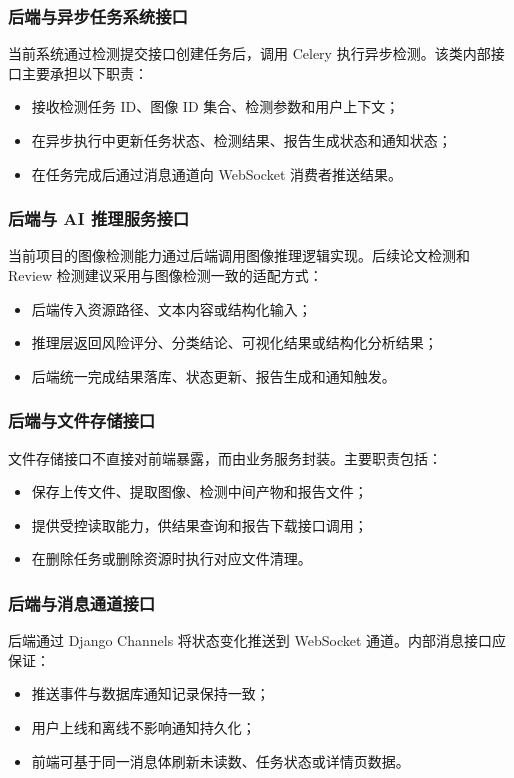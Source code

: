 \subsubsection{后端与异步任务系统接口}
当前系统通过检测提交接口创建任务后，调用 Celery 执行异步检测。该类内部接口主要承担以下职责：
\begin{itemize}[leftmargin=2em]
    \item 接收检测任务 ID、图像 ID 集合、检测参数和用户上下文；
    \item 在异步执行中更新任务状态、检测结果、报告生成状态和通知状态；
    \item 在任务完成后通过消息通道向 WebSocket 消费者推送结果。
\end{itemize}

\subsubsection{后端与 AI 推理服务接口}
当前项目的图像检测能力通过后端调用图像推理逻辑实现。后续论文检测和 Review 检测建议采用与图像检测一致的适配方式：
\begin{itemize}[leftmargin=2em]
    \item 后端传入资源路径、文本内容或结构化输入；
    \item 推理层返回风险评分、分类结论、可视化结果或结构化分析结果；
    \item 后端统一完成结果落库、状态更新、报告生成和通知触发。
\end{itemize}

\subsubsection{后端与文件存储接口}
文件存储接口不直接对前端暴露，而由业务服务封装。主要职责包括：
\begin{itemize}[leftmargin=2em]
    \item 保存上传文件、提取图像、检测中间产物和报告文件；
    \item 提供受控读取能力，供结果查询和报告下载接口调用；
    \item 在删除任务或删除资源时执行对应文件清理。
\end{itemize}

\subsubsection{后端与消息通道接口}
后端通过 Django Channels 将状态变化推送到 WebSocket 通道。内部消息接口应保证：
\begin{itemize}[leftmargin=2em]
    \item 推送事件与数据库通知记录保持一致；
    \item 用户上线和离线不影响通知持久化；
    \item 前端可基于同一消息体刷新未读数、任务状态或详情页数据。
\end{itemize}

